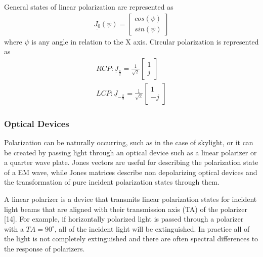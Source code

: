 %
General states of linear polarization are represented as
%
\begin{align}
    \underline{J_0}(\psi) =
    \begin{bmatrix}
        cos(\psi) \\
        sin(\psi)
    \end{bmatrix}
\end{align}
%
where $\psi$ is any angle in relation to the X axis.  Circular polarization is represented as
%
\begin{align}
    RCP: \underline{J}_{\frac{\pi}{2}} = \frac{1}{\sqrt{2}}
    \begin{bmatrix}
        1 \\
        j
    \end{bmatrix} \\
    LCP: \underline{J}_{-\frac{\pi}{2}} = \frac{1}{\sqrt{2}}
    \begin{bmatrix}
        1 \\
        -j
    \end{bmatrix}
\end{align}
%
\subsubsection{Optical Devices}
Polarization can be naturally occurring, such as in the case of skylight, or it can be created by passing light through an optical device such as a linear polarizer or a quarter wave plate.  Jones vectors are useful for describing the polarization state of a EM wave, while Jones matrices describe non depolarizing optical devices and the transformation of pure incident polarization states through them.

A linear polarizer is a device that transmits linear polarization states for incident light beams that are aligned with their transmission axis (TA) of the polarizer [14].  For example, if horizontally polarized light is passed through a polarizer with a $TA = 90^{\circ}$, all of the incident light will be extinguished.  In practice all of the light is not completely extinguished and there are often spectral differences to the response of polarizers.

